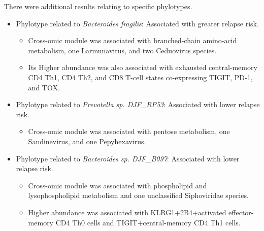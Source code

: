 \documentclass[11pt,a4paper]{article}
\begin{document}
There were additional results relating to specific phylotypes.
\begin{itemize}
    \item Phylotype related to \textit{Bacteroides fragilis}: Associated with greater relapse risk. 
    \begin{itemize}
        \item Cross-omic module was associated with branched-chain amino-acid metabolism, one Larmunavirus, and two Ceduovirus species. 
        \item Its Higher abundance was also associated with exhausted central-memory CD4 Th1, CD4 Th2, and CD8 T-cell states co-expressing TIGIT, PD-1, and TOX.
    \end{itemize}
    \item Phylotype related to \textit{Prevotella sp. DJF\_RP53}: Associated with lower relapse risk.
    \begin{itemize}
        \item Cross-omic module was associated with pentose metabolism, one Sandinevirus, and one Pepyhexavirus.
    \end{itemize} 
    \item Phylotype related to \textit{Bacteroides sp. DJF\_B097}: Associated with lower relapse risk.
    \begin{itemize}
        \item Cross-omic module was associated with phospholipid and lysophospholipid metabolism and one unclassified Siphoviridae species.
        \item  Higher abundance was associated with KLRG1+2B4+activated effector-memory CD4 Th0 cells and TIGIT+central-memory CD4 Th1 cells.
    \end{itemize}
\end{itemize}
\end{document}
